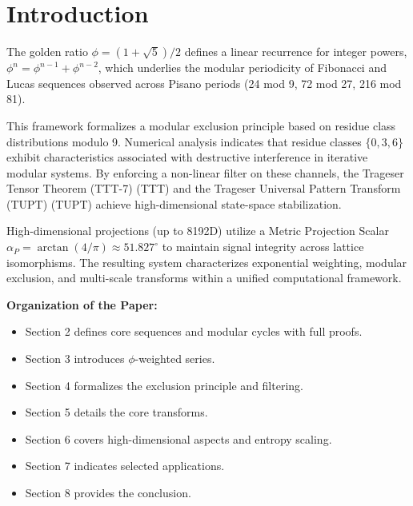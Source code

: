 \section{Introduction}

The golden ratio $\phi = (1 + \sqrt{5})/2$ defines a linear recurrence for integer powers, $\phi^n = \phi^{n-1} + \phi^{n-2}$, which underlies the modular periodicity of Fibonacci and Lucas sequences observed across Pisano periods (24 mod 9, 72 mod 27, 216 mod 81).

This framework formalizes a modular exclusion principle based on residue class distributions modulo 9. Numerical analysis indicates that residue classes $\{0, 3, 6\}$ exhibit characteristics associated with destructive interference in iterative modular systems. By enforcing a non-linear filter on these channels, the Trageser Tensor Theorem (TTT-7) (TTT) and the Trageser Universal Pattern Transform (TUPT) (TUPT) achieve high-dimensional state-space stabilization.

High-dimensional projections (up to 8192D) utilize a Metric Projection Scalar $\alpha_P = \arctan(4/\pi) \approx 51.827^\circ$ to maintain signal integrity across lattice isomorphisms. The resulting system characterizes exponential weighting, modular exclusion, and multi-scale transforms within a unified computational framework.

\vspace{1em}
\noindent\textbf{Organization of the Paper:} 
\begin{itemize}[leftmargin=*, label=\textcolor{nrcblue}{\textbullet}]
\item \textsf{Section 2} defines core sequences and modular cycles with full proofs.
\item \textsf{Section 3} introduces $\phi$-weighted series.
\item \textsf{Section 4} formalizes the exclusion principle and filtering.
\item \textsf{Section 5} details the core transforms.
\item \textsf{Section 6} covers high-dimensional aspects and entropy scaling.
\item \textsf{Section 7} indicates selected applications.
\item \textsf{Section 8} provides the conclusion.
\end{itemize}